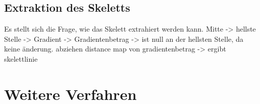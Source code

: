 \subsection{Extraktion des Skeletts}
Es stellt sich die Frage, wie das Skelett extrahiert werden kann.
Mitte -> hellste Stelle -> Gradient -> Gradientenbetrag -> ist null an der hellsten Stelle, da keine änderung. abziehen distance map von gradientenbetrag -> ergibt skelettlinie
\section{Weitere Verfahren}
